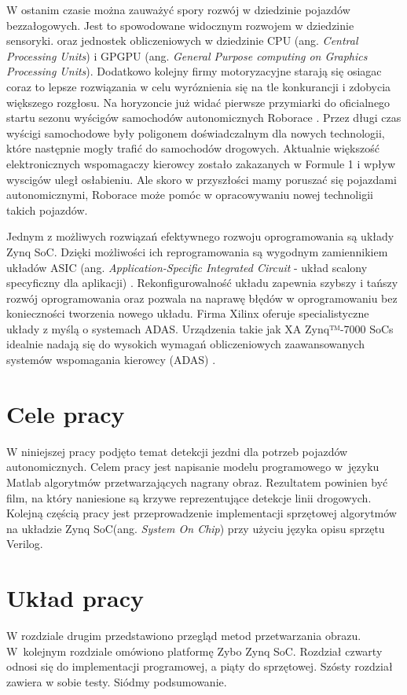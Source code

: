 

W ostanim czasie można zauważyć spory rozwój w dziedzinie pojazdów bezzałogowych. Jest to spowodowane widocznym rozwojem w dziedzinie sensoryki. oraz jednostek obliczeniowych w dziedzinie CPU (ang. \textit{Central Processing Units}) i GPGPU (ang. \textit{General Purpose computing on Graphics Processing Units}). Dodatkowo kolejny firmy motoryzacyjne starają się osiagac coraz to lepsze rozwiązania w celu wyróznienia się na tle konkurancji i zdobycia większego rozgłosu. Na horyzoncie już widać pierwsze przymiarki do oficialnego startu sezonu wyścigów samochodów autonomicznych Roborace \cite{roborace}. Przez długi czas wyścigi samochodowe były poligonem doświadczalnym dla nowych technologii, które następnie mogły trafić do samochodów drogowych. Aktualnie większość elektronicznych wspomagaczy kierowcy zostało zakazanych w Formule 1 i wpływ wyscigów uległ osłabieniu. Ale skoro w przyszłości mamy poruszać się pojazdami autonomicznymi, Roborace może pomóc w opracowywaniu nowej technoligii takich pojazdów.

Jednym z możliwych rozwiązań efektywnego rozwoju oprogramowania są układy Zynq SoC. Dzięki możliwości ich reprogramowania są wygodnym zamiennikiem układów ASIC (ang. \textit{Application-Specific Integrated Circuit} - układ scalony specyficzny dla aplikacji) \cite{ASIC_zynq}. Rekonfigurowalność układu zapewnia szybszy i tańszy rozwój oprogramowania oraz pozwala na naprawę błędów w oprogramowaniu bez konieczności tworzenia nowego układu.
Firma Xilinx oferuje specialistyczne układy z myślą o systemach ADAS. Urządzenia takie jak XA Zynq™-7000 SoCs idealnie nadają się do wysokich wymagań obliczeniowych zaawansowanych systemów wspomagania kierowcy (ADAS) \cite{xilinx}.


\section{Cele pracy}
W niniejszej pracy podjęto temat detekcji jezdni dla potrzeb pojazdów autonomicznych.  
Celem pracy jest napisanie modelu programowego w~języku Matlab algorytmów przetwarzających nagrany obraz. 
Rezultatem powinien być film, na który naniesione są krzywe reprezentujące detekcje linii drogowych.
Kolejną częścią pracy jest przeprowadzenie implementacji sprzętowej algorytmów na układzie Zynq SoC(ang. \textit{System On Chip}) przy użyciu języka opisu sprzętu Verilog. 
\section{Układ pracy}
W rozdziale drugim przedstawiono przegląd metod przetwarzania obrazu. 
W~kolejnym rozdziale omówiono platformę Zybo Zynq SoC. 
Rozdział czwarty odnosi się do implementacji programowej, a piąty do sprzętowej. Szósty rozdział zawiera w sobie testy. Siódmy podsumowanie. 
